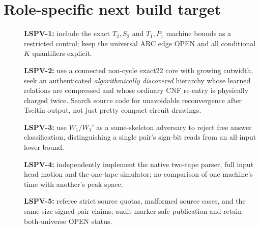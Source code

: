 \documentclass[11pt]{article}
\begin{document}
\section{Role-specific next build target}
\begin{description}
\item[]\textbf{LSPV-1:} include the exact $T_2,S_2$ and $T_1,P_1$ machine bounds as a restricted control; keep the universal ARC edge OPEN and all conditional $K$ quantifiers explicit.
\item[]\textbf{LSPV-2:} use a connected non-cycle exact22 core with growing cutwidth, seek an authenticated \emph{algorithmically discovered} hierarchy whose learned relations are compressed and whose ordinary CNF re-entry is physically charged twice. Search source code for unavoidable reconvergence after Tseitin output, not just pretty compact circuit drawings.
\item[]\textbf{LSPV-3:} use $W_1/W_1'$ as a same-skeleton adversary to reject free answer classification, distinguishing a single pair's sign-bit reads from an all-input lower bound.
\item[]\textbf{LSPV-4:} independently implement the native two-tape parser, full input head motion and the one-tape simulator; no comparison of one machine's time with another's peak space.
\item[]\textbf{LSPV-5:} referee strict source quotas, malformed source cases, and the same-size signed-pair claims; audit marker-safe publication and retain both-universe OPEN status.
\end{description}



\end{document}
